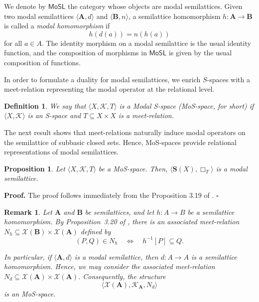\documentclass{article}
\newtheorem{definition}{\bf Definition}[section]
\newtheorem{remark}{\bf Remark}[section]
\newtheorem{proposition}{\bf Proposition}[section]
\newenvironment{proof}
{\par\noindent\textbf{Proof. }\rm}
{\hfill$\boldsymbol{\square}$\par\vspace{0.3cm}}
\begin{document}
We denote by $\mathsf{MoSL}$ the category whose objects are modal semilattices. 
Given two modal semilattices $\langle \mathbf{A}, d \rangle$ and $\langle \mathbf{B}, n \rangle$, 
a semilattice homomorphism $h \colon \mathbf{A} \to \mathbf{B}$ is called a \emph{modal homomorphism} if
\[
  h(d(a)) = n(h(a))
\]
for all $a \in A$. 
The identity morphism on a modal semilattice is the usual identity function, 
and the composition of morphisms in $\mathsf{MoSL}$ is given by the usual composition of functions.
\medskip

In order to formulate a duality for modal semilattices, we enrich $S$-spaces with a meet-relation representing the modal operator at the relational level.

\begin{definition}
    We say that $\langle X,\mathcal{K},T \rangle$ is a Modal S-space (MoS-space, for short) if $\langle X,\mathcal{K}\rangle$ is an S-space 
    and $T\subseteq X \times X$ is a meet-relation.
\end{definition}

The next result shows that meet-relations naturally induce modal operators on the semilattice of subbasic closed sets. Hence, MoS-spaces provide relational representations of modal semilattices.

\begin{proposition}\label{S(X) es modal}
    Let $\langle X, \mathcal{K}, T \rangle$ be a MoS-space. Then,  $\langle \mathbf{S}(X),\Box_T\rangle$ is a modal semilattice.
\end{proposition}
\begin{proof}
    The proof follows immediately from the Proposition 3.19 of \cite{CG}.
\end{proof}

\begin{remark}\label{definicion D_m}
Let $\mathbf{A}$ and $\mathbf{B}$ be semilattices, and let $h:A\to B$ be a semilattice homomorphism. By Proposition~3.20 of \cite{CG}, there is an associated meet-relation $N_h \subseteq \mathcal{X}(\mathbf{B}) \times \mathcal{X}(\mathbf{A})$ defined by
\[
(P,Q) \in N_h \quad \Longleftrightarrow \quad h^{-1}[P] \subseteq Q.
\]

In particular, if $\langle \mathbf{A}, d \rangle$ is a modal semilattice, then $d \colon A \to A$ is a semilattice homomorphism. Hence, we may consider the associated meet-relation $N_d \subseteq \mathcal{X}(\mathbf{A}) \times \mathcal{X}(\mathbf{A})$. Consequently, the structure
\[
\langle \mathcal{X}(\mathbf{A}), \mathcal{K}_{\mathbf{A}}, N_d \rangle
\]
is an MoS-space.
\end{remark}
\end{document}
